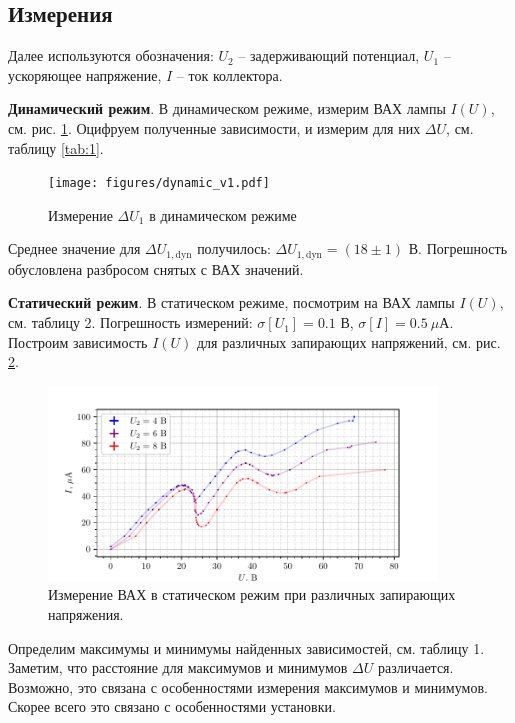 \subsection*{Измерения}

Далее используются обозначения: $U_2$ -- задерживающий потенциал, $U_1$ -- ускоряющее напряжение, $I$ -- ток коллектора. 

\textbf{Динамический режим}. В динамическом режиме,  измерим ВАХ лампы $I(U)$, см. рис. \ref{fig:lamp}. Оцифруем полученные зависимости, и измерим для них $\Delta U$, см. таблицу \ref{tab:1}. 
\begin{figure}[h]
    \centering
    \texttt{[image: figures/dynamic\_v1.pdf]}
    \caption{Измерение $\Delta U_1$ в динамическом режиме}
    \label{fig:lamp}
\end{figure}

Среднее значение для $\Delta U_{1, \text{dyn}}$ получилось: $ \Delta U_{1, \text{dyn}} = (18 \pm 1) \text{ В}.$ 
Погрешность обусловлена разбросом снятых с ВАХ значений. 


\textbf{Статический режим}. В статическом режиме, посмотрим на ВАХ лампы $I(U)$, см. таблицу 2. Погрешность измерений: $\sigma[U_1] = 0.1$ В, $\sigma[I] = 0.5\ \mu$А. Построим зависимость $I(U)$ для различных запирающих напряжений, см. рис. \ref{fig:1}.
\vspace{-12mm}
\begin{figure}[h]
    \centering
    \includegraphics[width=0.92\textwidth]{figures/plot1.pdf}
    \caption{Измерение ВАХ в статическом режим при различных запирающих напряжения.}
    \label{fig:1}
\end{figure}

Определим максимумы и минимумы найденных зависимостей, см. таблицу 1. Заметим, что расстояние для максимумов и минимумов $\Delta U$ различается. Возможно, это связана с особенностями измерения максимумов и минимумов. Скорее всего это связано с особенностями установки.




